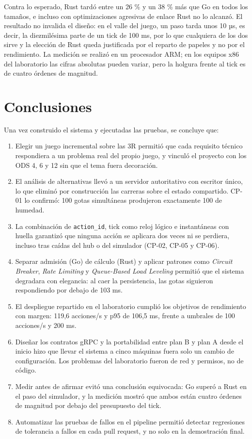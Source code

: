 \documentclass[11pt,letterpaper]{article}
\begin{document}
Contra lo esperado, Rust tardó entre un 26 \% y un 38 \% más que Go en todos los tamaños, e incluso con optimizaciones agresivas de enlace Rust no lo alcanzó. El resultado no invalida el diseño: en el valle del juego, un paso tarda unos 10 µs, es decir, la diezmilésima parte de un tick de 100 ms, por lo que cualquiera de los dos sirve y la elección de Rust queda justificada por el reparto de papeles y no por el rendimiento. La medición se realizó en un procesador ARM; en los equipos x86 del laboratorio las cifras absolutas pueden variar, pero la holgura frente al tick es de cuatro órdenes de magnitud.

\section{Conclusiones}

Una vez construido el sistema y ejecutadas las pruebas, se concluye que:
\begin{enumerate}
\item Elegir un juego incremental sobre las 3R permitió que cada requisito técnico respondiera a un problema real del propio juego, y vinculó el proyecto con los ODS 4, 6 y 12 sin que el tema fuera decoración.
\item El análisis de alternativas llevó a un servidor autoritativo con escritor único, lo que eliminó por construcción las carreras sobre el estado compartido. CP-01 lo confirmó: 100 gotas simultáneas produjeron exactamente 100 de humedad.
\item La combinación de \texttt{action\_id}, tick como reloj lógico e instantáneas con huella garantizó que ninguna acción se aplicara dos veces ni se perdiera, incluso tras caídas del hub o del simulador (CP-02, CP-05 y CP-06).
\item Separar admisión (Go) de cálculo (Rust) y aplicar patrones como \textit{Circuit Breaker}, \textit{Rate Limiting} y \textit{Queue-Based Load Leveling} permitió que el sistema degradara con elegancia: al caer la persistencia, las gotas siguieron respondiendo por debajo de 103 ms.
\item El despliegue repartido en el laboratorio cumplió los objetivos de rendimiento con margen: 119,6 acciones/s y p95 de 106,5 ms, frente a umbrales de 100 acciones/s y 200 ms.
\item Diseñar los contratos gRPC y la portabilidad entre plan B y plan A desde el inicio hizo que llevar el sistema a cinco máquinas fuera solo un cambio de configuración. Los problemas del laboratorio fueron de red y permisos, no de código.
\item Medir antes de afirmar evitó una conclusión equivocada: Go superó a Rust en el paso del simulador, y la medición mostró que ambos están cuatro órdenes de magnitud por debajo del presupuesto del tick.
\item Automatizar las pruebas de fallos en el pipeline permitió detectar regresiones de tolerancia a fallos en cada pull request, y no solo en la demostración final.
\end{enumerate}
\end{document}
